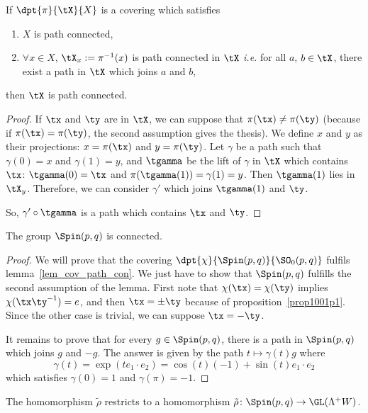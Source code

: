 \begin{lemma}
If $\dpt{\pi}{\tX}{X}$ is a covering which satisfies

\begin{enumerate}
\item $X$ is path connected,
\item $\forall x\in X$, $\tX_x:=\pi^{-1}(x)$ is path connected in $\tX$ \emph{i.e.} for all $a$, $b\in \tX$, there exist a path in $\tX$ which joins $a$ and $b$,
\end{enumerate}
then $\tX$ is path connected.
\label{lem_cov_path_con}
\end{lemma}
\begin{proof}
If $\tx$ and $\ty$ are in $\tX$, we can suppose that $\pi(\tx)\neq\pi(\ty)$ (because if $\pi(\tx)=\pi(\ty)$, the second assumption gives the thesis). We define $x$ and $y$ as their projections: $x=\pi(\tx)$ and $y=\pi(\ty)$. Let $\gamma$ be a path such that $\gamma(0)=x$ and $\gamma(1)=y$, and $\tgamma$ be the lift of $\gamma$ in $\tX$ which contains $\tx$: $\tgamma(0)=\tx$ and $\pi(\tgamma(1))=\gamma(1)=y$. Then $\tgamma(1)$ lies in $\tX_y$. Therefore, we can consider $\gamma'$ which joins $\tgamma(1)$ and $\ty$.

So, $\gamma'\circ\tgamma$ is a path which contains $\tx$ and $\ty$.
\end{proof}


\begin{proposition}
 The group $\Spin(p,q)$ is connected.
\end{proposition}

\begin{proof}
We will prove that the covering $\dpt{\chi}{\Spin(p,q)}{\SO_0(p,q)}$ fulfils lemma~\ref{lem_cov_path_con}. We just have to show that $\Spin(p,q)$ fulfills the second assumption of the lemma. First note that $\chi(\tx)=\chi(\ty)$ implies $\chi(\tx\ty^{-1})=e$, and then $\tx=\pm\ty$ because of proposition~\ref{prop1001p1}. Since the other case is trivial, we can suppose $\tx=-\ty$.

It remains to prove that for every $g\in\Spin(p,q)$, there is a path in $\Spin(p,q)$ which joins $g$ and $-g$. The answer is given by the path $t\mapsto \gamma(t)g$ where
\[
\gamma(t)=\exp(te_1\cdot e_2)=\cos(t)(-1)+\sin(t)e_1\cdot e_2
\]
which satisfies $\gamma(0)=1$ and $\gamma(\pi)=-1$.
\end{proof}

\begin{proposition}

The homomorphism $\tilde\rho$ restricts to a homomorphism $\tilde\rho\colon \Spin(p,q)\to \GL(\Lambda^+W)$.
\end{proposition}

